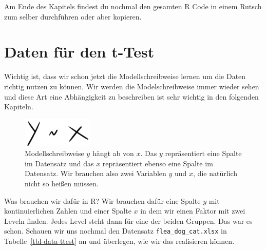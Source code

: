 \documentclass[
  letterpaper,
]{scrbook}
\begin{document}
Am Ende des Kapitels findest du nochmal den gesamten R Code in einem
Rutsch zum selber durchführen oder aber kopieren.

\hypertarget{daten-fuxfcr-den-t-test}{%
\section{Daten für den t-Test}\label{daten-fuxfcr-den-t-test}}

Wichtig ist, dass wir schon jetzt die Modellschreibweise lernen um die
Daten richtig nutzen zu können. Wir werden die Modelschreibweise immer
wieder sehen und diese Art eine Abhängigkeit zu beschreiben ist sehr
wichtig in den folgenden Kapiteln.

\begin{figure}

{\centering \includegraphics[width=0.3\textwidth,height=\textheight]{./images/statistical_modeling_0.png}

}

\caption{\label{fig-ttest-0}Modellschreibweise \(y\) hängt ab von \(x\).
Das \(y\) repräsentiert eine Spalte im Datensatz und das \(x\)
repräsentiert ebenso eine Spalte im Datensatz. Wir brauchen also zwei
Variablen \(y\) und \(x\), die natürlich nicht so heißen müssen.}

\end{figure}

{}

Was brauchen wir dafür in R? Wir brauchen dafür eine Spalte \(y\) mit
kontinuierlichen Zahlen und einer Spalte \(x\) in dem wir einen Faktor
mit zwei Leveln finden. Jedes Level steht dann für eine der beiden
Gruppen. Das war es schon. Schauen wir uns nochmal den Datensatz
\texttt{flea\_dog\_cat.xlsx} in Tabelle~\ref{tbl-data-ttest} an und
überlegen, wie wir das realisieren können.
\end{document}
